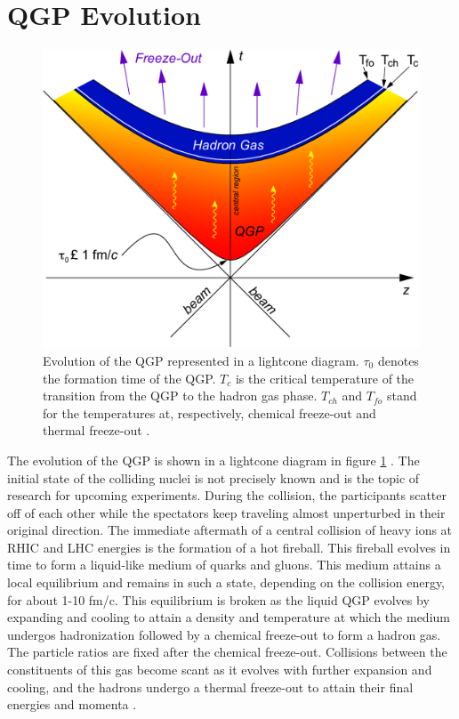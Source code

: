 \section{QGP Evolution}
\begin{figure}[h]
  \centering
  \includegraphics[width=5.5in]{figures/LightCone1_color-crop_NThesis.pdf}
  \caption{Evolution of the QGP represented in a lightcone diagram. $\tau_{0}$ denotes the formation time of the QGP. $T_{c}$ is the critical temperature of the transition from the QGP to the hadron gas phase. $T_{ch}$ and $T_{fo}$ stand for the temperatures at, respectively, chemical freeze-out and thermal freeze-out \cite{Connors:2017ptx}.}\label{fig:lightcone}
\end{figure}
The evolution of the QGP is shown in a lightcone diagram in figure \ref{fig:lightcone} \cite{Connors:2017ptx}. The initial state of the colliding nuclei is not precisely known and is the topic of research for upcoming experiments. During the collision, the participants scatter off of each other while the spectators keep traveling almost unperturbed in their original direction. The immediate aftermath of a central collision of heavy ions at RHIC and LHC energies is the formation of a hot fireball. This fireball evolves in time to form a liquid-like medium of quarks and gluons. This medium attains a local equilibrium and remains in such a state, depending on the collision energy, for about 1-10 fm/c. This equilibrium is broken as the liquid QGP evolves by expanding and cooling to attain a density and temperature at which the medium undergos hadronization followed by a chemical freeze-out to form a hadron gas. The particle ratios are fixed after the chemical freeze-out. Collisions between the constituents of this gas become scant as it evolves with further expansion and cooling, and the hadrons undergo a thermal freeze-out to attain their final energies and momenta \cite{Connors:2017ptx}.

